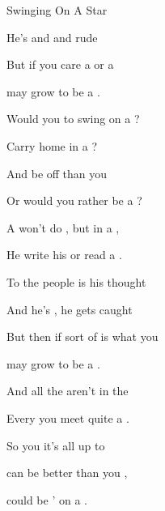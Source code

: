 \begin{SBSong}{Swinging On A Star}
\begin{SBVerse}
    He's  and  and  rude
    
    But if you  care a  or a  
    
     may grow  to be a .
  \end{SBVerse}
  \CBPageBrk
  \begin{SBChorus}
    Would you  to swing on a ?
    
    Carry  home in a ?
    
    And be  off than you 
    
    Or would you rather be a ?
  \end{SBChorus}
  \begin{SBVerse}
    A  won't do , but  in a ,
    
    He  write his  or read a .
    
    To  the people is his  thought
    
    And  he's , he  gets caught
    
    But then if  sort of  is what you  
    
     may grow  to be a .
  \end{SBVerse}
  \WBPageBrk
  \begin{SBVerse}
    And all the  aren't in the 
    
    Every  you meet quite a .
    
    So you  it's all up to 
    
     can be better than you ,     
    
     could be ' on a .
  \end{SBVerse}
\end{SBSong}